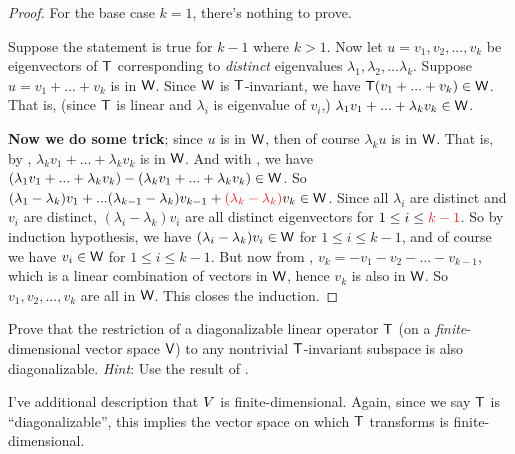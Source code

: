 \begin{proof}
For the base case \(k = 1\), there's nothing to prove.

Suppose the statement is true for \(k - 1\) where \(k > 1\).
Now let \(u = v_1, v_2, ..., v_k\) be eigenvectors of \(\textsf{T}\) corresponding to \emph{distinct} eigenvalues \(\lambda_1, \lambda_2, ... \lambda_k\).
Suppose \(u = v_1 + ... + v_k\) is in \(\textsf{W}\). 
Since \(\textsf{W}\) is \(\textsf{T}\)-invariant, we have \(\textsf{T}(v_1 + ... + v_k) \in \textsf{W}\).
That is, (since \(\textsf{T}\) is linear and \(\lambda_i\) is eigenvalue of \(v_i\),) \(\lambda_1 v_1 + ... + \lambda_k v_k \in \textsf{W}\). 

\textbf{Now we do some trick};
since \(u\) is in \(\textsf{W}\), then of course \(\lambda_k u\) is in \(\textsf{W}\).
That is, by , \(\lambda_k v_1 + ... + \lambda_k v_k\) is in \(\textsf{W}\).
And with , we have \((\lambda_1 v_1 + ... + \lambda_k v_k) - (\lambda_k v_1 + ... + \lambda_k v_k) \in \textsf{W}\).
So \((\lambda_1 - \lambda_k) v_1 + ... (\lambda_{k - 1} - \lambda_k) v_{k - 1} + \RED{(\lambda_k - \lambda_k)} v_k \in \W\).
Since all \(\lambda_i\) are distinct and \(v_i\) are distinct, \((\lambda_i - \lambda_k) v_i\) are all distinct eigenvectors for \(1 \le i \le \RED{k - 1}\).
So by induction hypothesis, we have \((\lambda_i - \lambda_k) v_i \in \textsf{W}\) for \(1 \le i \le k - 1\), and of course we have \(v_i \in \textsf{W}\) for \(1 \le i \le k - 1\).
But now from , \(v_k = -v_1 - v_2 - ... - v_{k - 1}\), which is a linear combination of vectors in \(\textsf{W}\), hence \(v_k\) is also in \(\textsf{W}\).
So \(v_1, v_2, ..., v_k\) are all in \(\textsf{W}\).
This closes the induction.
\end{proof}

\begin{exercise} \label{exercise 5.4.24}
Prove that the restriction of a diagonalizable linear operator \(\textsf{T}\) (on a \emph{finite}-dimensional vector space \(\textsf{V}\)) to any nontrivial \(\textsf{T}\)-invariant subspace is also diagonalizable.
\emph{Hint}: Use the result of .
\end{exercise}

\begin{note}
I've additional description that \(\\V\) is finite-dimensional.
Again, since we say \(\textsf{T}\) is ``diagonalizable'', this implies the vector space on which \(\textsf{T}\) transforms is finite-dimensional.
\end{note}

